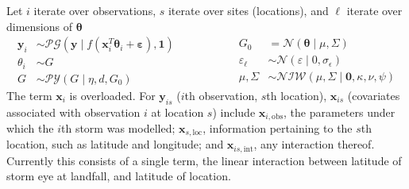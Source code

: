 Let $i$ iterate over observations, $s$ iterate over sites (locations), and $\ell$ iterate over 
    dimensions of $\bm{\theta}$
\begin{equation}
    \begin{aligned}
        \bm{y}_i &\sim \mathcal{PG}(\bm{y}\mid f(\bm{x}_i^T\bm{\theta}_i + \bm{\varepsilon}), \bm{1})\\
        \theta_i &\sim G\\
        G &\sim \mathcal{PY}(G\mid\eta, d, G_0)
    \end{aligned}
    ~\hspace{2cm}
    \begin{aligned}
        G_0 &= \mathcal{N}(\bm{\theta} \mid \mu, \Sigma)\\
        \varepsilon_{\ell} &\sim \mathcal{N}(\varepsilon \mid 0, \sigma_{\epsilon})\\
        \mu,\Sigma &\sim \mathcal{NIW}(\mu,\Sigma\mid \bm{0}, \kappa, \nu, \psi)
    \end{aligned}
\end{equation}
The term $\bm{x}_i$ is overloaded.  For $\bm{y}_{is}$ ($i$th observation, $s$th location), 
    $\bm{x}_{is}$ (covariates associated with observation $i$ at location $s$) include $\bm{x}_{i,\text{obs}}$, the parameters under which the $i$th storm 
    was modelled; $\bm{x}_{s,\text{loc}}$, information pertaining to the $s$th location, such
    as latitude and longitude; and $\bm{x}_{is,\text{int}}$, any interaction thereof.  Currently
    this consists of a single term, the linear interaction between latitude of storm eye at landfall, 
    and latitude of location.




















